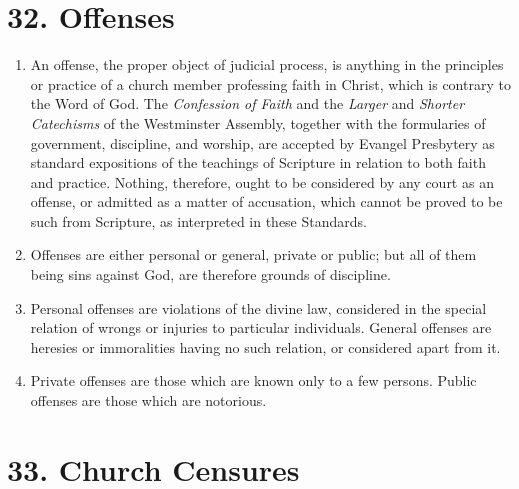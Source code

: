 \documentclass[
]{book}
\providecommand{\tightlist}{%
  \setlength{\itemsep}{0pt}\setlength{\parskip}{0pt}}
\begin{document}
\hypertarget{offenses}{%
\section*{32. Offenses}\label{offenses}}

\protect\hypertarget{chapter-slug-32-offenses}{\href{}{}}

\begin{enumerate}
\def\labelenumi{\arabic{enumi}.}
\tightlist
\item
  \protect\hypertarget{32}{\href{}{}}\protect\hypertarget{32.1}{\href{}{}}An offense, the proper object of judicial process, is anything in the principles or practice of a church member professing faith in Christ, which is contrary to the Word of God. The \emph{Confession of Faith} and the \emph{Larger} and \emph{Shorter Catechisms} of the Westminster Assembly, together with the formularies of government, discipline, and worship, are accepted by Evangel Presbytery as standard expositions of the teachings of Scripture in relation to both faith and practice. Nothing, therefore, ought to be considered by any court as an offense, or admitted as a matter of accusation, which cannot be proved to be such from Scripture, as interpreted in these Standards.
\item
  Offenses are either personal or general, private or public; but all of them being sins against God, are therefore grounds of discipline.
\item
  Personal offenses are violations of the divine law, considered in the special relation of wrongs or injuries to particular individuals. General offenses are heresies or immoralities having no such relation, or considered apart from it.
\item
  Private offenses are those which are known only to a few persons. Public offenses are those which are notorious.
\end{enumerate}

\hypertarget{church-censures}{%
\section*{33. Church Censures}\label{church-censures}}

\protect\hypertarget{chapter-slug-33-church-censures}{\href{}{}}
\end{document}
